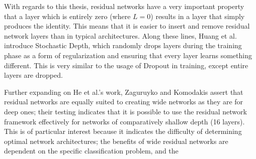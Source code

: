 With regards to this thesis, residual networks have a very important property that a layer which is entirely zero (where $L = 0$) results in a layer that simply produces the identity.
This means that it is easier to insert and remove residual network layers than in typical architectures.
Along these lines, Huang et al. \cite{huang2016deep} introduce Stochastic Depth, which randomly drops layers during the training phase as a form of regularization and ensuring that every layer learns something different.
This is very similar to the usage of Dropout in training, except entire layers are dropped.

Further expanding on He et al.'s work, Zaguruyko and Komodakis \cite{zagoruyko2016wide} assert that residual networks are equally suited to creating wide networks as they are for deep ones; their testing indicates that it is possible to use the residual network framework effectively for networks of comparatively shallow depth (16 layers).
This is of particular interest because it indicates the difficulty of determining optimal network architectures; the benefits of wide residual networks are dependent on the specific classification problem, and the 
 
